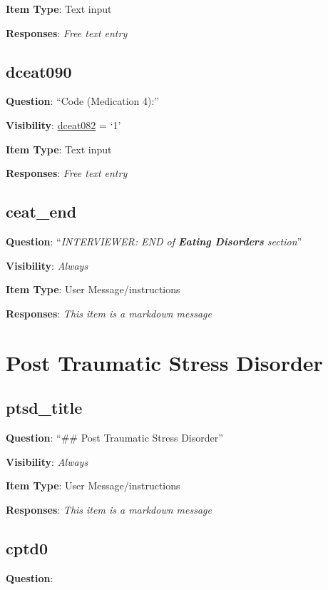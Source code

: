 \documentclass[]{book}
\begin{document}
\textbf{Item Type}: Text input

\textbf{Responses}: \emph{Free text entry}

\hypertarget{dceat090}{%
\section{dceat090}\label{dceat090}}

\textbf{Question}: ``Code (Medication 4):''

\textbf{Visibility}: \protect\hyperlink{dceat082}{dceat082} = `1'

\textbf{Item Type}: Text input

\textbf{Responses}: \emph{Free text entry}

\hypertarget{ceat_end}{%
\section{ceat\_end}\label{ceat_end}}

\textbf{Question}: ``\emph{INTERVIEWER: END of \textbf{Eating Disorders} section}''

\textbf{Visibility}: \emph{Always}

\textbf{Item Type}: User Message/instructions

\textbf{Responses}: \emph{This item is a markdown message}

\hypertarget{ptsd_section}{%
\chapter{Post Traumatic Stress Disorder}\label{ptsd_section}}

\hypertarget{ptsd_title}{%
\section{ptsd\_title}\label{ptsd_title}}

\textbf{Question}: ``\#\# Post Traumatic Stress Disorder''

\textbf{Visibility}: \emph{Always}

\textbf{Item Type}: User Message/instructions

\textbf{Responses}: \emph{This item is a markdown message}

\hypertarget{cptd0}{%
\section{cptd0}\label{cptd0}}

\textbf{Question}:
\end{document}
